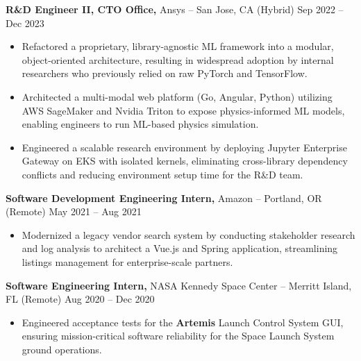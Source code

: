 \documentclass[11pt]{article}       %
\begin{document}
\textbf{R\&D Engineer II, CTO Office,} {Ansys} -- San Jose, CA (Hybrid) \hfill Sep 2022 -- Dec 2023 \\
\vspace{-9pt}
\begin{itemize}
  \item Refactored a proprietary, library-agnostic ML framework into a modular, object-oriented architecture, 
  resulting in widespread adoption by internal researchers who previously relied on raw PyTorch and TensorFlow.
  \item Architected a multi-modal web platform (Go, Angular, Python) utilizing AWS SageMaker and Nvidia Triton to expose physics-informed ML models, 
  enabling engineers to run ML-based physics simulation.
  \item Engineered a scalable research environment by deploying Jupyter Enterprise Gateway on EKS with isolated kernels, 
  eliminating cross-library dependency conflicts and reducing environment setup time for the R\&D team.
\end{itemize}

\textbf{Software Development Engineering Intern,} {Amazon} -- Portland, OR (Remote) \hfill May 2021 -- Aug 2021 \\
\vspace{-9pt}
\begin{itemize}
  \item Modernized a legacy vendor search system by conducting stakeholder research 
  and log analysis to architect a Vue.js and Spring application, streamlining listings management for enterprise-scale partners.
\end{itemize}

\textbf{Software Engineering Intern,} {NASA Kennedy Space Center} -- Merritt Island, FL (Remote) \hfill Aug 2020 -- Dec 2020 \\
\vspace{-9pt}
\begin{itemize}
  \item Engineered acceptance tests for the \textbf{Artemis} Launch Control System GUI, ensuring mission-critical software 
  reliability for the Space Launch System ground operations.
\end{itemize}
\end{document}
